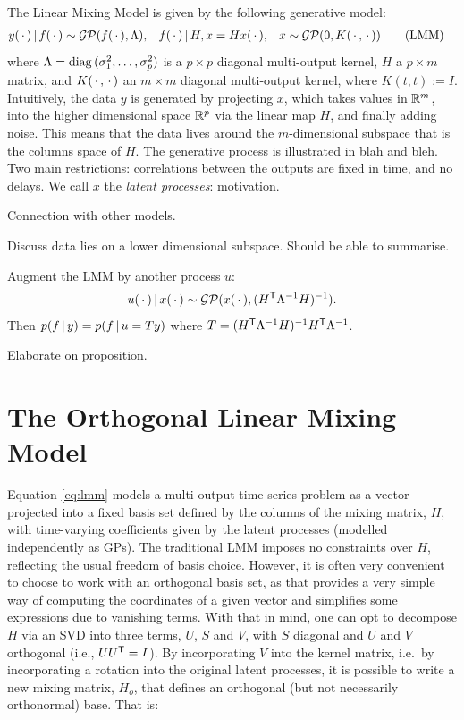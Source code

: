 \documentclass{article}
\begin{document}
The Linear Mixing Model is given by the following generative model:
\begin{align} \label{eq:lmm}
    y(\,\cdot\,)\, | \, f(\,\cdot\,) &\sim \mathcal{GP}(f(\,\cdot\,), \Lambda), &
    f(\,\cdot\,)\, | \, H, x &= Hx(\,\cdot\,), &
    x &\sim \mathcal{GP}(0, K(\,\cdot\,, \,\cdot\,)) \tag{LMM}
\end{align}
where $\Lambda=\operatorname{diag}\,(\sigma_1^2,\ldots,\sigma_p^2)$ is a $p\times p$ diagonal multi-output kernel, $H$ a $p \times m$ matrix, and $K(\,\cdot\,,\,\cdot\,)$ an $m \times m$ diagonal multi-output kernel, where $K(t, t) := I$.
Intuitively, the data $y$ is generated by projecting $x$, which takes values in $\mathbb{R}^m$, into the higher dimensional space $\mathbb{R}^p$ via the linear map $H$, and finally adding noise.
This means that the data lives around the $m$-dimensional subspace that is the columns space of $H$.
The generative process is illustrated in blah and bleh.
Two main restrictions: correlations between the outputs are fixed in time, and no delays.
We call $x$ the \textit{latent processes}: motivation.

Connection with other models.

Discuss data lies on a lower dimensional subspace. Should be able to summarise.

\begin{proposition} \label{prop:augmentation}
    Augment the LMM by another process $u$:
    \begin{align*}
        u(\,\cdot\,)\, | \, x(\,\cdot\,) \sim \mathcal{GP}(x(\,\cdot\,), (H^{\text{\textsf{T}}} \Lambda^{-1} H)^{-1}).
    \end{align*}
    Then $p(f\, | \, y) = p(f\, | \, u=Ty)$ where $T=(H^{\text{\textsf{T}}} \Lambda^{-1} H)^{-1} H^{\text{\textsf{T}}} \Lambda^{-1}$.
\end{proposition}

Elaborate on proposition.

\section{The Orthogonal Linear Mixing Model}
\label{sec:olmm}

Equation \eqref{eq:lmm} models a multi-output time-series problem as a vector projected into a fixed basis set defined by the columns of the mixing matrix, $H$, with time-varying coefficients given by the latent processes (modelled independently as GPs). The traditional LMM imposes no constraints over $H$, reflecting the usual freedom of basis choice. 
However, it is often very convenient to choose to work with an orthogonal basis set, as that provides a very simple way of computing the coordinates of a given vector and simplifies some expressions due to vanishing terms. With that in mind, one can opt to decompose $H$ via an SVD into three terms, $U$, $S$ and $V$, with $S$ diagonal and $U$ and $V$ orthogonal (i.e., $U U^{\text{\textsf{T}}} = I$). 
By incorporating $V$ into the kernel matrix, i.e.\ by incorporating a rotation into the original latent processes, it is possible to write a new mixing matrix, $H_o$, that defines an orthogonal (but not necessarily orthonormal) base. That is:
\end{document}
